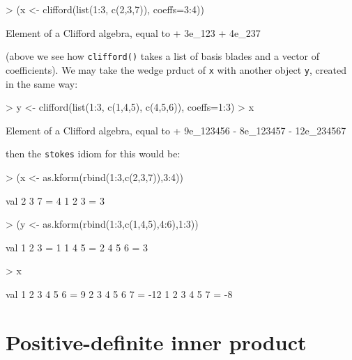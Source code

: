 \documentclass{birkjour}
\theoremstyle{definition}
\theoremstyle{remark}
\numberwithin{equation}{section}
\begin{document}
\begin{Schunk}
\begin{Sinput}
> (x <- clifford(list(1:3, c(2,3,7)), coeffs=3:4))
\end{Sinput}
\begin{Soutput}
Element of a Clifford algebra, equal to
+ 3e_123 + 4e_237
\end{Soutput}
\end{Schunk}

(above we see how {\tt clifford()} takes a list of basis blades and a
vector of coefficients).  We may take the wedge prduct of {\tt x} with
another object {\tt y}, created in the same way:

\begin{Schunk}
\begin{Sinput}
> y <- clifford(list(1:3, c(1,4,5), c(4,5,6)), coeffs=1:3)
> x %
\end{Sinput}
\begin{Soutput}
Element of a Clifford algebra, equal to
+ 9e_123456 - 8e_123457 - 12e_234567
\end{Soutput}
\end{Schunk}

then the {\tt stokes} idiom for this would be:

\begin{Schunk}
\begin{Sinput}
> (x <- as.kform(rbind(1:3,c(2,3,7)),3:4))
\end{Sinput}
\begin{Soutput}
           val
 2 3 7  =    4
 1 2 3  =    3
\end{Soutput}
\begin{Sinput}
> (y <- as.kform(rbind(1:3,c(1,4,5),4:6),1:3))
\end{Sinput}
\begin{Soutput}
           val
 1 2 3  =    1
 1 4 5  =    2
 4 5 6  =    3
\end{Soutput}
\begin{Sinput}
> x %
\end{Sinput}
\begin{Soutput}
                 val
 1 2 3 4 5 6  =    9
 2 3 4 5 6 7  =  -12
 1 2 3 4 5 7  =   -8
\end{Soutput}
\end{Schunk}


\section{Positive-definite inner product}
\end{document}
